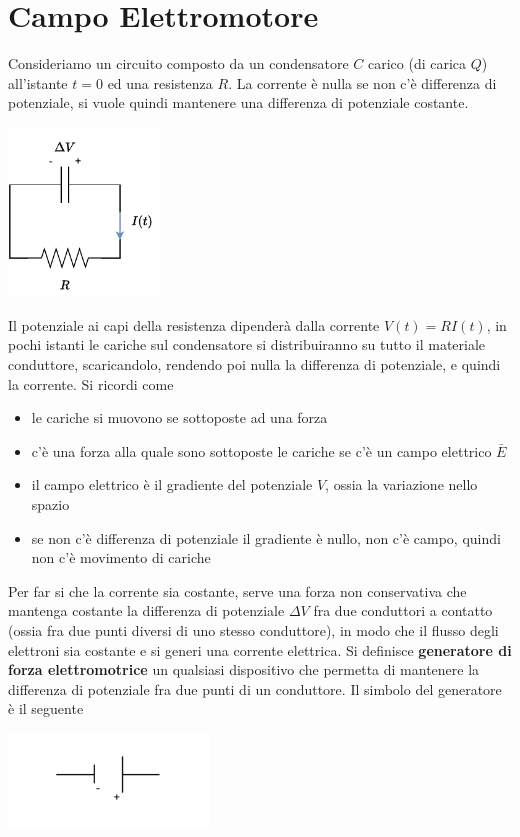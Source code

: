 \documentclass[10pt, letterpaper]{report}
\begin{document}
\section{Campo Elettromotore}
Consideriamo un circuito composto da un condensatore $C$ carico (di carica $Q$) all'istante $t=0$ ed una resistenza $R$.
La corrente è nulla se non c'è differenza di potenziale, si vuole quindi mantenere una differenza di potenziale costante.
\begin{center}
    \includegraphics[width=0.3\textwidth]{images/circuit.pdf}
\end{center}
Il potenziale ai capi della resistenza dipenderà dalla corrente $V(t)=RI(t)$, in pochi istanti le cariche sul condensatore si distribuiranno su tutto il materiale conduttore, scaricandolo, rendendo poi nulla la differenza di potenziale, e quindi la corrente. Si ricordi come \begin{itemize}
    \item le cariche si muovono se sottoposte ad una forza 
    \item c'è una forza alla quale sono sottoposte le cariche se c'è un campo elettrico $\bar E$
    \item il campo elettrico è il gradiente del potenziale $V$, ossia la variazione nello spazio 
    \item se non c'è differenza di potenziale il gradiente è nullo, non c'è campo, quindi non c'è movimento di cariche
\end{itemize}
Per far si che la corrente sia costante, serve una forza non conservativa che mantenga costante la differenza di potenziale $\Delta V$ fra due conduttori a contatto (ossia fra due punti diversi di uno stesso conduttore), in modo che il flusso degli elettroni sia costante e si generi una corrente elettrica.\acc 
Si definisce \textbf{generatore di forza elettromotrice} un qualsiasi dispositivo che permetta di mantenere la differenza di potenziale fra due punti di un conduttore. Il simbolo del generatore è il seguente\begin{center}
    \includegraphics[width=0.4\textwidth]{images/tensione.pdf}
\end{center}
\end{document}
